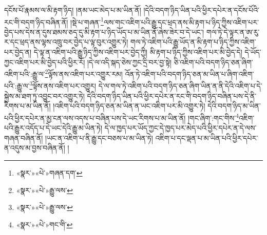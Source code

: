 དངོས་པོ་རྣམས་ལ་མི་རྟག་ཉིད། །ནམ་ཡང་མེད་པ་མ་ཡིན་ནོ། །དེའི་བདག་ཉིད་ཡིན་པའི་ཕྱིར་དཔེར་ན་དངོས་པོའི་རང་གི་བདག་ཉིད་བཞིན་ནོ། །སྡེ་པ་གཞན་\footnote{«སྣར་»«པེ་»གཞན་དག་}ལས་གང་འཇིག་པའི་རྒྱུ་དང་ཕྲད་ནས་མི་རྟག་པ་ཉིད་ཀྱིས་འཇིག་པར་བྱེད་པས་དེས་ན་དུས་ཐམས་ཅད་དུ་མི་རྟག་པ་ཉིད་ཡོད་པ་མ་ཡིན་ནོ་ཞེས་ཟེར་བ་དེ་ཡང་། གལ་ཏེ་དེ་ལྟར་ན་ཨ་རུ་ར་དང་ཕྲད་ནས་ལྷས་འཁྲུ་བར་བྱེད་པ་ལྟ་བུར་འགྱུར་ཏེ། གལ་ཏེ་འཇིག་པའི་རྒྱུ་ཡོད་ན་མི་རྟག་པ་ཉིད་ཀྱིས་འཇིག་པར་བྱེད་ན། དེ་ལྟ་ན་འཇིག་པའི་རྒྱུ་ཉིད་ཀྱིས་འཇིག་པར་བྱེད་ཀྱི། མི་རྟག་པ་ཉིད་ཀྱིས་འཇིག་པར་མི་བྱེད་དེ། དེ་ཡོད་ཀྱང་འཇིག་པར་མི་བྱེད་པའི་ཕྱིར་རོ། །དེ་ལ་འདི་སྐད་ཅེས་ཀྱང་དྲི་བར་བྱ་སྟེ། ཅི་འཇིག་པའི་བདག་ཉིད་ཅན་ཞིག་འཇིག་པའི་:རྒྱུ་ལ་\footnote{«སྣར་»«པེ་»རྒྱུ་ལས་}ལྟོས་ནས་འཇིག་པར་འགྱུར་རམ། འོན་ཏེ་འཇིག་པའི་བདག་ཉིད་ཅན་མ་ཡིན་པ་ཞིག་འཇིག་པའི་:རྒྱུ་ལ་\footnote{«སྣར་»«པེ་»རྒྱུ་ལས་}ལྟོས་ནས་འཇིག་པར་འགྱུར། དེ་ལ་གལ་ཏེ་འཇིག་པའི་བདག་ཉིད་ཅན་ཞིག་ཡིན་ན་ནི་དེའི་འཇིག་པ་དེ་སྐྱེས་མ་ཐག་ཏུ་འབྱུང་བར་འགྱུར་ཏེ། དེའི་བདག་ཉིད་ཡིན་པའི་ཕྱིར་དཔེར་ན་རང་གི་བདག་ཉིད་བཞིན་པས་དེ་ནི་རིགས་པ་མ་ཡིན་ནོ། །འཇིག་པའི་བདག་ཉིད་ཅན་མ་ཡིན་ན་ཡང་འཇིག་པར་མི་འགྱུར་ཏེ། དེའི་བདག་ཉིད་མ་ཡིན་པའི་ཕྱིར་དཔེར་ན་མྱ་ངན་ལས་འདས་པ་བཞིན་པས་དེ་ཡང་རིགས་པ་མ་ཡིན་ནོ། །གང་ཞིག་:གང་གིས་\footnote{«སྣར་»«པེ་»གང་གི་}འཇིག་པའི་རྒྱུར་འདོད་པ་དེ་ཡང་དེའི་རྒྱུ་མ་ཡིན་ཏེ། དེ་ལ་ཁྱད་པར་ཡོད་ཀྱང་དེ་ཁྱད་པར་མེད་པའི་ཕྱིར་དཔེར་ན་དེ་ལས་གཞན་བཞིན་ནོ། །ཡང་ན་འཇིག་པ་ནི་རྒྱུ་དང་བཅས་པ་མ་ཡིན་ཏེ། འཇིག་པ་དང་ལྡན་པ་མ་ཡིན་པའི་ཕྱིར་དཔེར་ན་འདུས་མ་བྱས་བཞིན་ནོ། །
